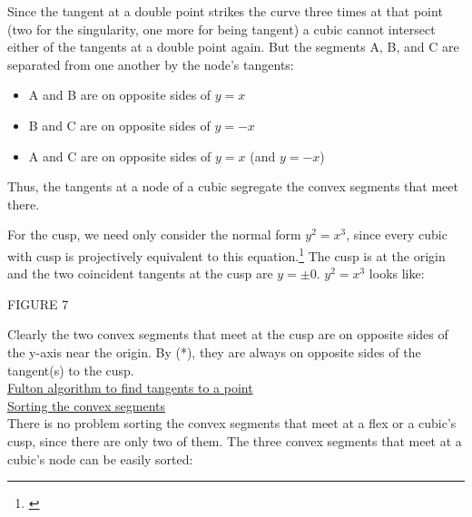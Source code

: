 Since the tangent at a double point strikes the curve three times
at that point (two for the singularity, one more for being tangent)
a cubic
\marginpar{(*)}
cannot intersect either of the tangents at a double point again.
But the segments A, B, and C are separated from one another by the
node's tangents:
\begin{itemize}
\item A and B are on opposite sides of $y=x$
\item B and C are on opposite sides of $y= -x$
\item A and C are on opposite sides of $y=x$ (and $y= -x$)
\end{itemize}
Thus, the tangents at a node of a cubic segregate the convex segments
that meet there.

For the cusp, we need only consider the normal form $y^{2} = x^{3}$,
since every cubic with cusp is projectively equivalent to this 
equation.\footnote{\cite[p.\ 128]{namba}}
The cusp is at the origin and the two coincident tangents at the cusp
are $y=\pm 0$.
$y^{2} = x^{3}$ looks like:
\begin{center}
FIGURE 7
\end{center}
Clearly the two convex segments that meet at the cusp are on opposite
sides of the y-axis near the origin.
\hence By (*), they are always on opposite sides of the tangent(s) to
 the cusp.\vspace{.25in} \\
\underline{Fulton algorithm to find tangents to a point}
\marginpar{$\leftarrow$}
\\ 
%
%
\underline{Sorting the convex segments}\vspace{.25in} \\
There is no problem sorting the convex segments that meet
at a flex or a cubic's cusp, since there are only two of them.
The three convex segments that meet at a cubic's node can be easily sorted:
